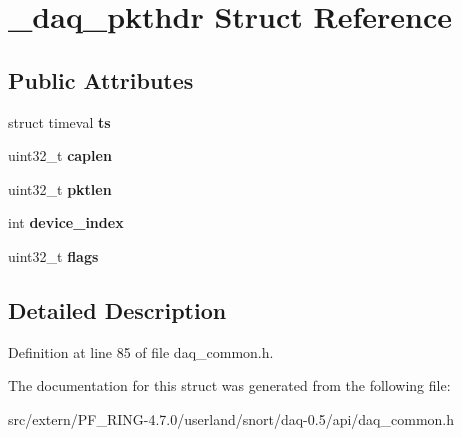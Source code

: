 \hypertarget{struct__daq__pkthdr}{
\section{\_\-daq\_\-pkthdr Struct Reference}
\label{struct__daq__pkthdr}
}
\subsection*{Public Attributes}
\begin{DoxyCompactItemize}
\item 
\hypertarget{struct__daq__pkthdr_a8399c8fef5d2bbf3332ed1b84b735cfc}{
struct timeval {\bfseries ts}}
\label{struct__daq__pkthdr_a8399c8fef5d2bbf3332ed1b84b735cfc}

\item 
\hypertarget{struct__daq__pkthdr_a0c6a4ec827d7d9060fd32bfc231e6b74}{
uint32\_\-t {\bfseries caplen}}
\label{struct__daq__pkthdr_a0c6a4ec827d7d9060fd32bfc231e6b74}

\item 
\hypertarget{struct__daq__pkthdr_a3308082c5ef3f38612c2c4c74f6eb590}{
uint32\_\-t {\bfseries pktlen}}
\label{struct__daq__pkthdr_a3308082c5ef3f38612c2c4c74f6eb590}

\item 
\hypertarget{struct__daq__pkthdr_a1351a17d9eb888aeb5faaad8574a7d41}{
int {\bfseries device\_\-index}}
\label{struct__daq__pkthdr_a1351a17d9eb888aeb5faaad8574a7d41}

\item 
\hypertarget{struct__daq__pkthdr_a1473f7d0c6b40f6c5f0a30af74d207f2}{
uint32\_\-t {\bfseries flags}}
\label{struct__daq__pkthdr_a1473f7d0c6b40f6c5f0a30af74d207f2}

\end{DoxyCompactItemize}


\subsection{Detailed Description}


Definition at line 85 of file daq\_\-common.h.



The documentation for this struct was generated from the following file:\begin{DoxyCompactItemize}
\item 
src/extern/PF\_\-RING-\/4.7.0/userland/snort/daq-\/0.5/api/daq\_\-common.h\end{DoxyCompactItemize}
